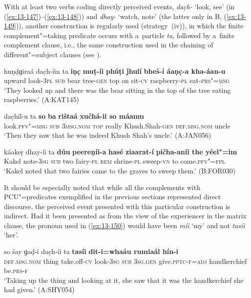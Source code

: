  With at least two verbs coding directly perceived events, \textit{dac̣h-} `look, see' (in (\ref{ex:13-147})--(\ref{ex:13-148})) and \textit{dhay-} `watch, note' (the latter only in B, (\ref{ex:13-149})), another construction is regularly used (strategy~(iv)), in which the finite complement"=taking predicate occurs with a~particle \textit{ta}, followed by a~finite complement clause, i.e., the same construction used in the chaining of different"=subject clauses (see ). 

\begin{exe}
\ex
\label{ex:13-147}
\gll huṇḍɡiraá dac̣h-íin ta \textbf{iṇc̣} \textbf{muṭ-íi} \textbf{phúṭi} \textbf{ǰhulí} \textbf{ bheš-í áaṇc̣-a kha-áan-u} \\
upward look-\textsc{3pl} \textsc{sub} bear tree-\textsc{gen} top on sit-\textsc{cv} raspberry-\textsc{pl} eat-\textsc{prs"=msg}  \\
\glt `They looked up and there was the bear sitting in the top of the tree eating raspberries.' (A:KAT145)

\ex
\label{ex:13-148}
\gll dac̣híl-u ta \textbf{so} \textbf{ba} \textbf{rištaá} \textbf{ xučhá-ii so máamu} \\
look.\textsc{pfv"=msg} \textsc{sub} \textsc{3msg.nom} \textsc{top} really Khush.Shah-\textsc{gen} \textsc{def.msg.nom} uncle  \\
\glt `Then they saw that he was indeed Khush Shah's uncle.' (A:JAN056)

\ex
\label{ex:13-149}
\gll káakeṛ dhay-íi ta \textbf{dúu} \textbf{peereṇíi-a} \textbf{hasé} \textbf{ziaarat-í} \textbf{ pičha-aníi the yéel"=im}\\
Kakel note-\textsc{3sg} \textsc{sub} two fairy-\textsc{pl}  \textsc{rem} shrine-\textsc{pl} sweep-\textsc{vn} to come.\textsc{pfv"=fpl}\\
\glt `Kakel noted that two fairies came to the graves to sweep them.' (B:FOR030) 
\end{exe}

It should be especially noted that while all the complements with PCU"=predicates exemplified in the previous sections represented direct discourse, the perceived event presented with this particular construction is indirect. Had it been presented as from the view of the experiencer in the matrix clause, the pronoun used in (\ref{ex:13-150}) would have been \textit{míi} `my' and not \textit{tasíi} `her'.

\begin{exe}
\ex
\label{ex:13-150}
\gll so šay ɡaḍ-í dac̣h-íi ta \textbf{tasíi} \textbf{ dit-i=whaáu rumiaál hín-i} \\
\textsc{def.msg.nom} thing take.off-\textsc{cv} look-\textsc{3sg} \textsc{sub} \textsc{3sg.gen} give.\textsc{pptc-f}=\textsc{adj} handkerchief be.\textsc{prs-f} \\
\glt `Taking up the thing and looking at it, she saw that it was the handkerchief she had given.' (A:SHY054)
\end{exe}

